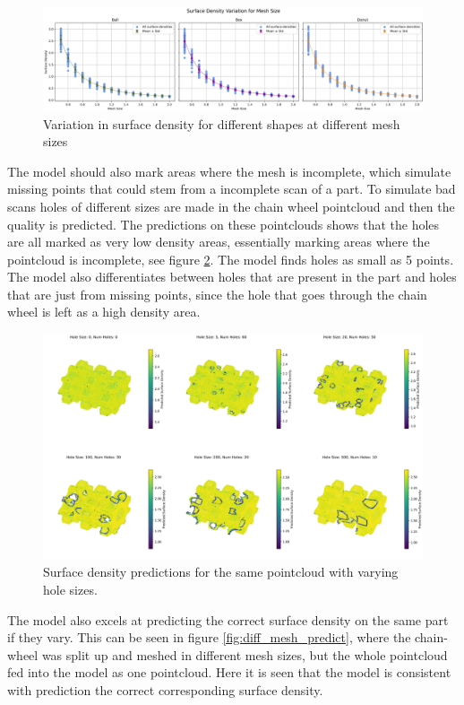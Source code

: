 \begin{figure}[t]
    \centering
    \includegraphics[width=\textwidth]{figures/sd_vs_mesh_lowQ.png}
    \caption{Variation in surface density for different shapes at different mesh sizes}
    \label{fig:sd_mesh}
\end{figure}

The model should also mark areas where the mesh is incomplete, which simulate missing points that could stem from a incomplete scan of a part. To simulate bad scans holes of different sizes are made in the chain wheel pointcloud and then the quality is predicted. The predictions on these pointclouds shows that the holes are all marked as very low density areas, essentially marking areas where the pointcloud is incomplete, see figure \ref{fig:holes_predict}. The model finds holes as small as 5 points. The model also differentiates between holes that are present in the part and holes that are just from missing points, since the hole that goes through the chain wheel is left as a high density area.

\begin{figure}[t]
    \centering
    \includegraphics[width=\textwidth]{figures/result3_lowQ.png}
    \caption{Surface density predictions for the same pointcloud with varying hole sizes.}
    \label{fig:holes_predict}
\end{figure}

The model also excels at predicting the correct surface density on the same part if they vary. This can be seen in figure \ref{fig:diff_mesh_predict}, where the chain-wheel was split up and meshed in different mesh sizes, but the whole pointcloud fed into the model as one pointcloud. Here it is seen that the model is consistent with prediction the correct corresponding surface density.


